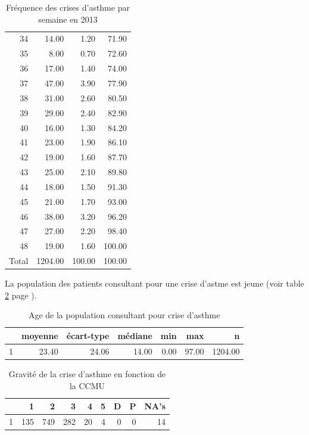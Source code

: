 \documentclass[12pt,english,french,twoside]{report}\usepackage[]{graphicx}\usepackage[]{color}
\begin{document}
\begin{table}[ht]
\begin{tabular}{rrrr}
  34 & 14.00 & 1.20 & 71.90 \\ 
  35 & 8.00 & 0.70 & 72.60 \\ 
  36 & 17.00 & 1.40 & 74.00 \\ 
  37 & 47.00 & 3.90 & 77.90 \\ 
  38 & 31.00 & 2.60 & 80.50 \\ 
  39 & 29.00 & 2.40 & 82.90 \\ 
  40 & 16.00 & 1.30 & 84.20 \\ 
  41 & 23.00 & 1.90 & 86.10 \\ 
  42 & 19.00 & 1.60 & 87.70 \\ 
  43 & 25.00 & 2.10 & 89.80 \\ 
  44 & 18.00 & 1.50 & 91.30 \\ 
  45 & 21.00 & 1.70 & 93.00 \\ 
  46 & 38.00 & 3.20 & 96.20 \\ 
  47 & 27.00 & 2.20 & 98.40 \\ 
  48 & 19.00 & 1.60 & 100.00 \\ 
    Total & 1204.00 & 100.00 & 100.00 \\ 
   \hline
\end{tabular}
\caption[Fréquence des crises d'asthme]{Fréquence des crises d'asthme par semaine en 2013} 
\label{tab:freq_asthme}
\end{table}




La population des patients consultant pour une crise d'astme est jeune (voir table \ref{tab:age_asthme} page \pageref{tab:age_asthme}).

\begin{table}[ht]
\centering
\begin{tabular}{rrrrrrr}
  \hline
 & moyenne & écart-type & médiane & min & max & n \\ 
  \hline
1 & 23.40 & 24.06 & 14.00 & 0.00 & 97.00 & 1204.00 \\ 
   \hline
\end{tabular}
\caption[Asthme et age]{Age de la population consultant pour crise d'asthme} 
\label{tab:age_asthme}
\end{table}
\begin{table}[ht]
\centering
\begin{tabular}{rrrrrrrrr}
  \hline
 & 1 & 2 & 3 & 4 & 5 & D & P & NA's \\ 
  \hline
1 & 135 & 749 & 282 &  20 &   4 &   0 &   0 &  14 \\ 
   \hline
\end{tabular}
\caption[Asthme et CCMU]{Gravité de la crise d'asthme en fonction de la CCMU} 
\label{tab:ccmu_asthme}
\end{table}
\end{document}
